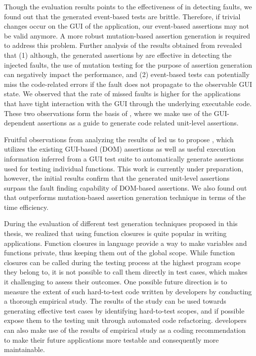 Though the evaluation results points to the effectiveness of \jseft in detecting faults, we found out that the generated event-based tests are brittle. Therefore, if trivial changes occur on the GUI of the application, our event-based assertions may not be valid anymore. A more robust mutation-based assertion generation is required to address this problem.
Further analysis of the results obtained from \jseft revealed that (1) although, the generated assertions by \jseft are effective in detecting the injected faults, the use of mutation testing for the purpose of assertion generation can negatively impact the performance, and (2) event-based tests can potentially miss the code-related errors if the fault does not propagate to the observable GUI state. We observed that the rate of missed faults is higher for the applications that have tight interaction with the GUI through the underlying executable code. These two observations form the basis of , where we make use of the GUI-dependent assertions as a guide to generate code related unit-level assertions.

 Fruitful observations from analyzing the results of \jseft led us to propose \atrina, which utilizes the existing GUI-based (\ie DOM) assertions as well as useful execution information inferred from a GUI test suite to automatically generate assertions used for testing individual functions. This work is currently under preparation, however, the initial results confirm that the generated unit-level assertions surpass the fault finding capability of DOM-based assertions. We also found out that \atrina outperforms mutation-based assertion generation technique in terms of the time efficiency.

During the evaluation of different test generation techniques proposed in this thesis, we realized that using function closures is quite popular in writing \javascript applications. 
Function closures in \javascript language provide a way to make variables and functions private, thus keeping them out of the global scope.
While function closures can be called during the testing process at the highest program scope they belong to, it is not possible to call them directly in test cases, which makes it challenging to assess their outcomes.
One possible future direction is to measure the extent of such hard-to-test code written by developers by conducting a thorough empirical study.
The results of the study can be used towards generating effective test cases by identifying hard-to-test scopes, and if possible expose them to the testing unit through automated code refactoring. \javascript developers can also make use of the results of empirical study as a coding recommendation to make their future applications more testable and consequently more maintainable.

